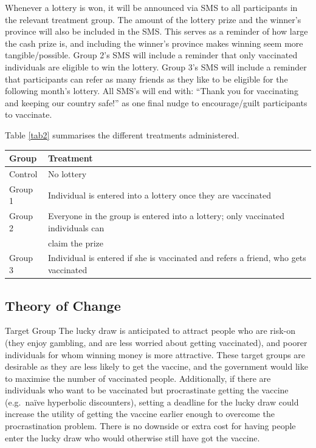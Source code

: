 \documentclass[11pt,preprint, authoryear]{elsarticle}
\let\origtable\table
\let\endorigtable\endtable
\renewenvironment{table}[1][2] {
    \expandafter\origtable\expandafter[H]
} {
    \endorigtable
}
\numberwithin{equation}{section}
\numberwithin{figure}{section}
\numberwithin{table}{section}
\begin{document}
Whenever a lottery is won, it will be announced via SMS to all
participants in the relevant treatment group. The amount of the lottery
prize and the winner's province will also be included in the SMS. This
serves as a reminder of how large the cash prize is, and including the
winner's province makes winning seem more tangible/possible. Group 2's
SMS will include a reminder that only vaccinated individuals are
eligible to win the lottery. Group 3's SMS will include a reminder that
participants can refer as many friends as they like to be eligible for
the following month's lottery. All SMS's will end with: ``Thank you for
vaccinating and keeping our country safe!'' as one final nudge to
encourage/guilt participants to vaccinate.

Table \ref{tab2} summarises the different treatments administered.

\begin{table}[H]
\centering
\begin{tabular}{ll}
  \toprule
Group & Treatment \\ 
  \midrule
Control & No lottery \\ 
  Group 1 & Individual is entered into a lottery once they are vaccinated \\ 
  Group 2 & Everyone in the group is entered into a lottery; only vaccinated individuals can \\ 
   & claim the prize \\ 
  Group 3 & Individual is entered if she is vaccinated and refers a friend, who gets vaccinated \\ 
   \bottomrule
\end{tabular}
\caption{Treatment Summary \label{tab2}} 
\end{table}

\hypertarget{theory-of-change}{%
\subsection{Theory of Change}\label{theory-of-change}}

Target Group The lucky draw is anticipated to attract people who are
risk-on (they enjoy gambling, and are less worried about getting
vaccinated), and poorer individuals for whom winning money is more
attractive. These target groups are desirable as they are less likely to
get the vaccine, and the government would like to maximise the number of
vaccinated people. Additionally, if there are individuals who want to be
vaccinated but procrastinate getting the vaccine (e.g.~naïve hyperbolic
discounters), setting a deadline for the lucky draw could increase the
utility of getting the vaccine earlier enough to overcome the
procrastination problem. There is no downside or extra cost for having
people enter the lucky draw who would otherwise still have got the
vaccine.
\end{document}
